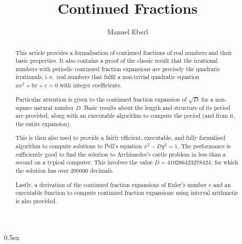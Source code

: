 \documentclass[11pt,a4paper]{article}
\begin{document}
\title{Continued Fractions}
\author{Manuel Eberl}
\maketitle

\begin{abstract}
This article provides a formalisation of continued fractions of real numbers and their basic properties.
It also contains a proof of the classic result that the irrational numbers with periodic continued
 fraction expansions are precisely the quadratic irrationals, i.\,e.\ real numbers that fulfil a non-trivial quadratic equation $a x^2 + b x + c = 0$ with integer coefficients.

Particular attention is given to the continued fraction expansion of $\sqrt{D}$ for a non-square
 natural number $D$. Basic results about the length and structure of its period are provided,
 along with an executable algorithm to compute the period (and from it, the entire expansion).

This is then also used to provide a fairly efficient, executable, and fully formalised algorithm to
compute solutions to Pell's equation $x^2 - D y^2 = 1$. The performance is sufficiently good to
find the solution to Archimedes's cattle problem in less than a second on a typical computer.
This involves the value $D = 410286423278424$, for which the solution has over 200000 decimals.

Lastly, a derivation of the continued fraction expansions of Euler's number $e$ and an executable
function to compute continued fraction expansions using interval arithmetic is also provided.
\end{abstract}

\newpage
\tableofcontents
\newpage
\parindent 0pt\parskip 0.5ex



\nocite{khinchin}



\end{document}
